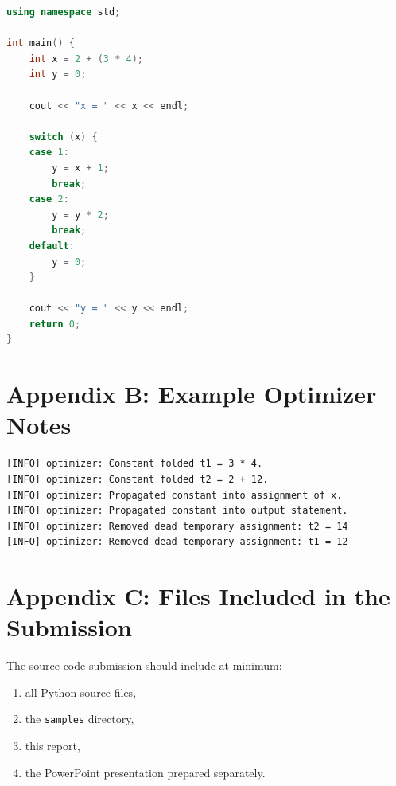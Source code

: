 \documentclass[12pt,a4paper]{article}
\begin{document}
\begin{lstlisting}[language=C++]
using namespace std;

int main() {
    int x = 2 + (3 * 4);
    int y = 0;

    cout << "x = " << x << endl;

    switch (x) {
    case 1:
        y = x + 1;
        break;
    case 2:
        y = y * 2;
        break;
    default:
        y = 0;
    }

    cout << "y = " << y << endl;
    return 0;
}
\end{lstlisting}

\section{Appendix B: Example Optimizer Notes}

\begin{lstlisting}
[INFO] optimizer: Constant folded t1 = 3 * 4.
[INFO] optimizer: Constant folded t2 = 2 + 12.
[INFO] optimizer: Propagated constant into assignment of x.
[INFO] optimizer: Propagated constant into output statement.
[INFO] optimizer: Removed dead temporary assignment: t2 = 14
[INFO] optimizer: Removed dead temporary assignment: t1 = 12
\end{lstlisting}

\section{Appendix C: Files Included in the Submission}
The source code submission should include at minimum:

\begin{enumerate}
    \item all Python source files,
    \item the \texttt{samples} directory,
    \item this report,
    \item the PowerPoint presentation prepared separately.
\end{enumerate}
\end{document}
